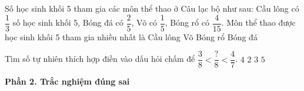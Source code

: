 \begin{ex} %
Số học sinh khối 5 tham gia các môn thể thao ở Câu lạc bộ như sau: Cầu lông có $\dfrac{1}{3}$ số học sinh khối 5, Bóng đá có $\dfrac{2}{5}$, Võ có $\dfrac{1}{5}$, Bóng rổ có $\dfrac{4}{15}$. Môn thể thao được học sinh khối 5 tham gia nhiều nhất là
\choice
{Cầu lông}
{Võ}
{Bóng rổ}
{\True Bóng đá}
\end{ex}

\begin{ex} %
Tìm số tự nhiên thích hợp điền vào dấu hỏi chấm để $\dfrac{3}{8} < \dfrac{?}{8} < \dfrac{4}{7}$.
\choice
{\True $4$}
{$2$}
{$3$}
{$5$}
\end{ex}

\textbf{Phần 2. Trắc nghiệm đúng sai}

